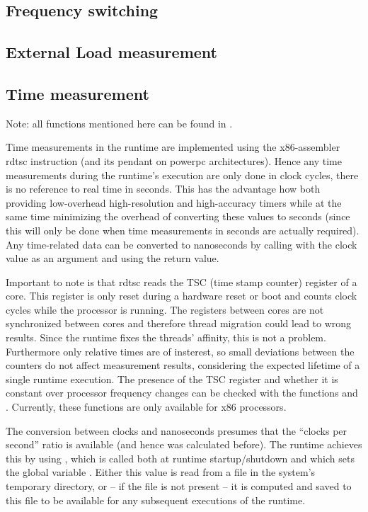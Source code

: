 \subsection{Frequency switching} 
\subsection{External Load measurement}
\subsection{Time measurement} 
\label{sec:runtime.time.measurement}

Note: all functions mentioned here can be found in .


Time measurements in the runtime are implemented using the x86-assembler rdtsc
instruction (and its pendant on powerpc architectures). Hence any time
measurements during the runtime's execution are only done in clock cycles, there
is no reference to real time in seconds. This has the advantage how both
providing low-overhead high-resolution and high-accuracy timers while at the
same time minimizing the overhead of converting these values to seconds (since
this will only be done when time measurements in seconds are actually required).
Any time-related data can be converted to nanoseconds by calling
 with the clock value as an
argument and using the return value.

Important to note is that rdtsc reads the TSC (time stamp counter) register of a
core. This register is only reset during a hardware reset or boot and counts
clock cycles while the processor is running. The registers between cores are not
synchronized between cores and therefore thread migration could lead to wrong
results. Since the runtime fixes the threads' affinity, this is not a problem.
Furthermore only relative times are of insterest, so small deviations between
the counters do not affect measurement results, considering the expected
lifetime of a single runtime execution. The presence of the TSC register and
whether it is constant over processor frequency changes can be checked with the
functions  and
. Currently, these functions are only
available for x86 processors.

The conversion between clocks and nanoseconds presumes that the ``clocks per
second'' ratio is available (and hence was calculated before). The runtime
achieves this by using ,
which is called both at runtime startup/shutdown and which sets the global
variable . Either this value is read from a
file  in the system's temporary directory,
or -- if the file is not present -- it is computed and saved to this file to be
available for any subsequent executions of the runtime. 

